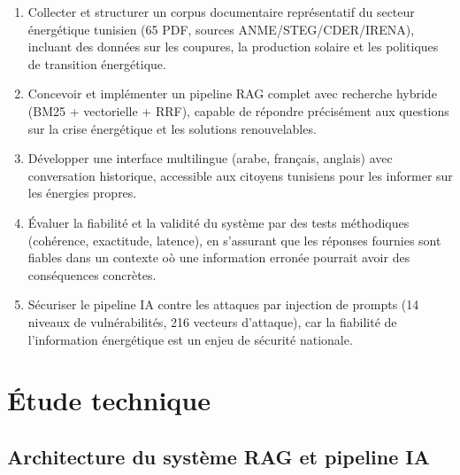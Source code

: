 \documentclass[12pt,a4paper,oneside]{report}
\newcommand{\chaptercolor}{mainblue}
\newcommand{\setchaptercolor}[1]{\renewcommand{\chaptercolor}{#1}}
\begin{document}
\begin{enumerate}[leftmargin=1.2cm]

\item Collecter et structurer un corpus documentaire repr\'{e}sentatif du secteur \'{e}nerg\'{e}tique tunisien (65 PDF, sources ANME/STEG/CDER/IRENA), incluant des donn\'{e}es sur les coupures, la production solaire et les politiques de transition \'{e}nerg\'{e}tique.

\item Concevoir et impl\'{e}menter un pipeline RAG complet avec recherche hybride (BM25 + vectorielle + RRF), capable de r\'{e}pondre pr\'{e}cis\'{e}ment aux questions sur la crise \'{e}nerg\'{e}tique et les solutions renouvelables.

\item D\'{e}velopper une interface multilingue (arabe, fran\c{c}ais, anglais) avec conversation historique, accessible aux citoyens tunisiens pour les informer sur les \'{e}nergies propres.

\item \'{E}valuer la fiabilit\'{e} et la validit\'{e} du syst\`{e}me par des tests m\'{e}thodiques (coh\'{e}rence, exactitude, latence), en s'assurant que les r\'{e}ponses fournies sont fiables dans un contexte o\`{o} une information erron\'{e}e pourrait avoir des cons\'{e}quences concr\`{e}tes.

\item S\'{e}curiser le pipeline IA contre les attaques par injection de prompts (14 niveaux de vuln\'{e}rabilit\'{e}s, 216 vecteurs d'attaque), car la fiabilit\'{e} de l'information \'{e}nerg\'{e}tique est un enjeu de s\'{e}curit\'{e} nationale.

\end{enumerate}








\part{\'{E}tude technique}
\setchaptercolor{mainblue}

\chapter{Architecture du syst\`{e}me RAG et pipeline IA}
\end{document}
